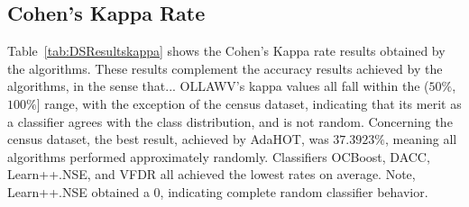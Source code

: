 \documentclass[reqno]{vcuthesis}
\numberwithin{equation}{chapter}
\begin{document}
\subsection{Cohen's Kappa Rate}
Table~\ref{tab:DSResultskappa} shows the Cohen's Kappa rate results obtained by the algorithms. These results complement the accuracy results achieved by the algorithms, in the sense that... OLLAWV's kappa values all fall within the ($50\%$, $100\%$] range, with the exception of the census dataset, indicating that its merit as a classifier agrees with the class distribution, and is not random. Concerning the census dataset, the best result, achieved by AdaHOT, was $37.3923\%$, meaning all algorithms performed approximately randomly. Classifiers OCBoost, DACC, Learn++.NSE, and VFDR all achieved the lowest rates on average. Note, Learn++.NSE obtained a 0, indicating complete random classifier behavior.
\end{document}
